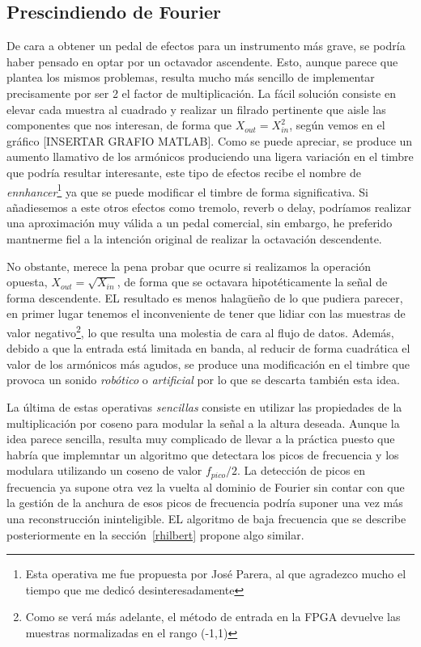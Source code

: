 \subsection{Prescindiendo de Fourier}
\label{nofourier}
De cara a obtener un pedal de efectos para un instrumento más grave, se podría haber pensado en optar por un octavador ascendente. Esto, aunque parece que plantea los mismos problemas, resulta mucho más sencillo de implementar precisamente por ser 2 el factor de multiplicación. La fácil solución consiste en elevar cada muestra al cuadrado y realizar un filrado pertinente que aisle las componentes que nos interesan, de forma que $X_{out} = X_{in}^{2}$, según vemos en el gráfico [INSERTAR GRAFIO MATLAB]. Como se puede apreciar, se produce un aumento llamativo de los armónicos produciendo una ligera variación en el timbre que podría resultar interesante, este tipo de efectos recibe el nombre de \emph{ennhancer}\footnote{Esta operativa me fue propuesta por José Parera, al que agradezco mucho el tiempo que me dedicó desinteresadamente} ya que se puede modificar el timbre de forma significativa. Si añadiesemos a este otros efectos como tremolo, reverb o delay, podríamos realizar una aproximación muy válida a un pedal comercial, sin embargo, he preferido mantnerme fiel a la intención original de realizar la octavación descendente.

No obstante, merece la pena probar que ocurre si realizamos la operación opuesta, $X_{out} = \sqrt{X_{in}}$, de forma que se octavara hipotéticamente la señal de forma descendente. EL resultado es menos halagüeño de lo que pudiera parecer, en primer lugar tenemos el inconveniente de tener que lidiar con las muestras de valor negativo\footnote{Como se verá más adelante, el método de entrada en la FPGA devuelve las muestras normalizadas en el rango (-1,1)}, lo que resulta una molestia de cara al flujo de datos. Además, debido a que la entrada está limitada en banda, al reducir de forma cuadrática el valor de los armónicos más agudos, se produce una modificación en el timbre que provoca un sonido \emph{robótico} o \emph{artificial} por lo que se descarta también esta idea.

La última de estas operativas \emph{sencillas} consiste en utilizar las propiedades de la multiplicación por coseno para modular la señal a la altura deseada. Aunque la idea parece sencilla, resulta muy complicado de llevar a la práctica puesto que habría que implemntar un algoritmo que detectara los picos de frecuencia y los modulara utilizando un coseno de valor $f_{pico}/2$. La detección de picos en frecuencia ya supone otra vez la vuelta al dominio de Fourier sin contar con que la gestión de la anchura de esos picos de frecuencia podría suponer una vez más una reconstrucción ininteligible. EL algoritmo de baja frecuencia que se describe posteriormente en la sección~\ref{rhilbert} propone algo similar.

